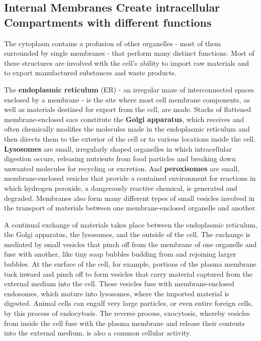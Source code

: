 \subsection{Internal Membranes Create intracellular Compartments with different functions}

The cytoplasm contains a profusion of other organelles - most of them surrounded
by single membranes - that perform many distinct functions. Most of these structures
are involved with the cell’s ability to import raw materials and to export
manufactured substances and waste products.

The \textbf{endoplasmic reticulum} (ER) - an irregular maze of interconnected
spaces enclosed by a membrane - is the site where most
cell membrane components, as well as materials destined for export
from the cell, are made. Stacks of flattened membrane-enclosed sacs
constitute the \textbf{Golgi apparatus}, which receives and often
chemically modifies the molecules made in the endoplasmic reticulum
and then directs them to the exterior of the cell or to various locations
inside the cell. \textbf{Lysosomes} are small, irregularly shaped organelles in
which intracellular digestion occurs, releasing nutrients from food particles
and breaking down unwanted molecules for recycling or excretion.
And \textbf{peroxisomes} are small, membrane-enclosed vesicles that provide a
contained environment for reactions in which hydrogen peroxide, a dangerously
reactive chemical, is generated and degraded. Membranes also
form many different types of small vesicles involved in the transport of
materials between one membrane-enclosed organelle and another.

A continual exchange of materials takes place between the endoplasmic
reticulum, the Golgi apparatus, the lysosomes, and the outside of the
cell. The exchange is mediated by small vesicles that pinch off from the
membrane of one organelle and fuse with another, like tiny soap bubbles
budding from and rejoining larger bubbles. At the surface of the cell, for
example, portions of the plasma membrane tuck inward and pinch off
to form vesicles that carry material captured from the external medium
into the cell. These vesicles fuse with membrane-enclosed
endosomes, which mature into lysosomes, where the imported material
is digested. Animal cells can engulf very large particles, or even entire
foreign cells, by this process of endocytosis. The reverse process, exocytosis,
whereby vesicles from inside the cell fuse with the plasma membrane
and release their contents into the external medium, is also a common
cellular activity.

